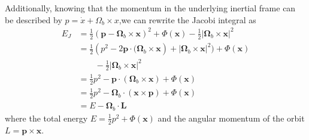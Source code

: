 Additionally, knowing that the momentum in the underlying inertial frame can be described by $p=\dot{x}+\Omega_b\times x$,we can rewrite the Jacobi integral as
\begin{align*}
    E_J&=\frac{1}{2}\left(\mathbf{p}-\mathbf{\Omega}_b\times \mathbf{x}\right)^2 + \Phi(\mathbf{x}) - \frac{1}{2}\left|\mathbf{\Omega}_b \times \mathbf{x}\right|^2 \\
    &=\frac{1}{2}\left(p^2 -2\mathbf{p}\cdot(\mathbf{\Omega}_b\times\mathbf{x}\right)
    +\left|\mathbf{\Omega}_b \times \mathbf{x}\right|^2) + \Phi(\mathbf{x})\\
    &\quad \quad- \frac{1}{2}|\mathbf{\Omega}_b \times \mathbf{x}|^2 \\
    &=\frac{1}{2}p^2 -\mathbf{p}\cdot(\mathbf{\Omega}_b\times\mathbf{x})
    + \Phi(\mathbf{x})\\
    &=\frac{1}{2}p^2 -\mathbf{\Omega}_b\cdot(\mathbf{x}\times\mathbf{p})
    + \Phi(\mathbf{x})\\
    &=E-\mathbf{\Omega}_b\cdot\mathbf{L}
\end{align*}
where the total energy $E=\frac{1}{2}p^2+\Phi(\mathbf{x})$ and the angular momentum of the orbit $L=\mathbf{p}\times\mathbf{x}$.



\clearpage